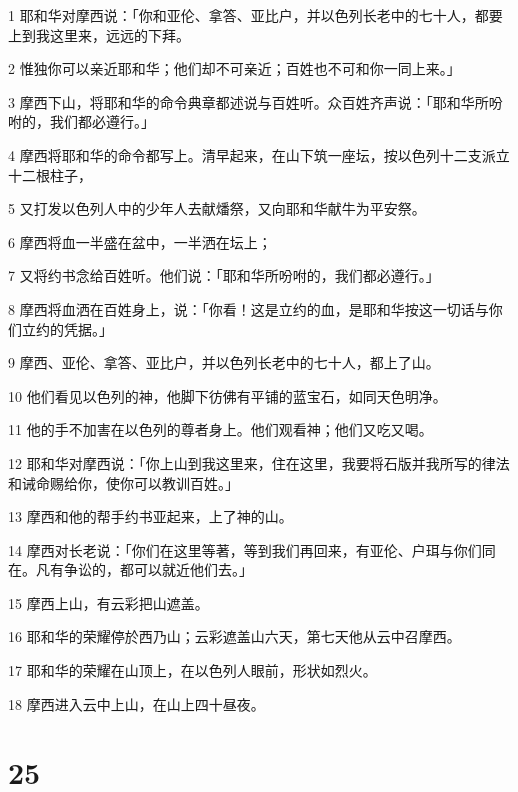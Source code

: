 \par 1 耶和华对摩西说：「你和亚伦、拿答、亚比户，并以色列长老中的七十人，都要上到我这里来，远远的下拜。
\par 2 惟独你可以亲近耶和华；他们却不可亲近；百姓也不可和你一同上来。」
\par 3 摩西下山，将耶和华的命令典章都述说与百姓听。众百姓齐声说：「耶和华所吩咐的，我们都必遵行。」
\par 4 摩西将耶和华的命令都写上。清早起来，在山下筑一座坛，按以色列十二支派立十二根柱子，
\par 5 又打发以色列人中的少年人去献燔祭，又向耶和华献牛为平安祭。
\par 6 摩西将血一半盛在盆中，一半洒在坛上；
\par 7 又将约书念给百姓听。他们说：「耶和华所吩咐的，我们都必遵行。」
\par 8 摩西将血洒在百姓身上，说：「你看！这是立约的血，是耶和华按这一切话与你们立约的凭据。」
\par 9 摩西、亚伦、拿答、亚比户，并以色列长老中的七十人，都上了山。
\par 10 他们看见以色列的神，他脚下彷佛有平铺的蓝宝石，如同天色明净。
\par 11 他的手不加害在以色列的尊者身上。他们观看神；他们又吃又喝。
\par 12 耶和华对摩西说：「你上山到我这里来，住在这里，我要将石版并我所写的律法和诫命赐给你，使你可以教训百姓。」
\par 13 摩西和他的帮手约书亚起来，上了神的山。
\par 14 摩西对长老说：「你们在这里等著，等到我们再回来，有亚伦、户珥与你们同在。凡有争讼的，都可以就近他们去。」
\par 15 摩西上山，有云彩把山遮盖。
\par 16 耶和华的荣耀停於西乃山；云彩遮盖山六天，第七天他从云中召摩西。
\par 17 耶和华的荣耀在山顶上，在以色列人眼前，形状如烈火。
\par 18 摩西进入云中上山，在山上四十昼夜。

\chapter{25}

